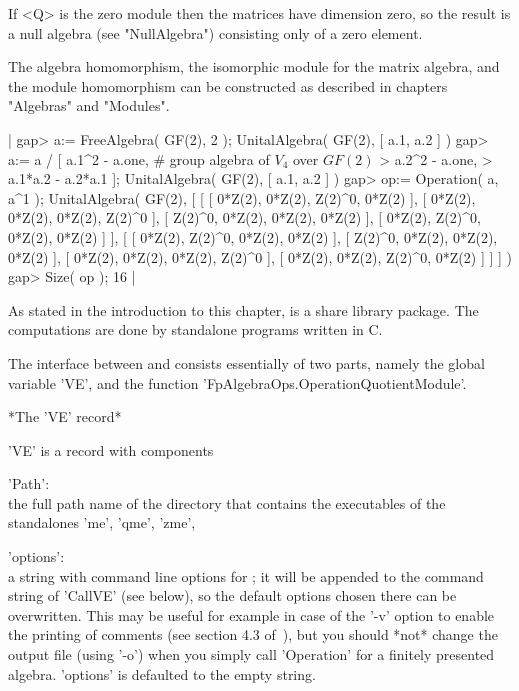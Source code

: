 If <Q> is the zero module then the matrices have dimension zero, so the
result is a null algebra (see "NullAlgebra") consisting only of a zero
element.

The algebra homomorphism, the isomorphic module for the matrix algebra,
and the module homomorphism can be constructed as described in chapters
"Algebras" and "Modules".

|    gap> a:= FreeAlgebra( GF(2), 2 );
    UnitalAlgebra( GF(2), [ a.1, a.2 ] )
    gap> a:= a / [ a.1^2 - a.one, # group algebra of $V_4$ over $GF(2)$
    >              a.2^2 - a.one,
    >              a.1*a.2 - a.2*a.1 ];
    UnitalAlgebra( GF(2), [ a.1, a.2 ] )
    gap> op:= Operation( a, a^1 );
    UnitalAlgebra( GF(2),
    [ [ [ 0*Z(2), 0*Z(2), Z(2)^0, 0*Z(2) ], [ 0*Z(2), 0*Z(2), 0*Z(2),
              Z(2)^0 ], [ Z(2)^0, 0*Z(2), 0*Z(2), 0*Z(2) ],
          [ 0*Z(2), Z(2)^0, 0*Z(2), 0*Z(2) ] ],
      [ [ 0*Z(2), Z(2)^0, 0*Z(2), 0*Z(2) ],
          [ Z(2)^0, 0*Z(2), 0*Z(2), 0*Z(2) ],
          [ 0*Z(2), 0*Z(2), 0*Z(2), Z(2)^0 ],
          [ 0*Z(2), 0*Z(2), Z(2)^0, 0*Z(2) ] ] ] )
    gap> Size( op );
    16 |


As stated in the introduction to this chapter, {\VE} is a share library
package.  The computations are done by standalone programs written in C.

The interface between {\VE} and {\GAP} consists essentially of two parts,
namely the global variable 'VE', and the function
'FpAlgebraOps.OperationQuotientModule'.

\vspace{5mm}

*The 'VE' record*

'VE' is a record with components

'Path': \\ the full path name of the directory that contains the
           executables of the standalones 'me', 'qme', 'zme',

'options': \\
  a string with command line options for {\VE};
  it will be appended to the command string of 'CallVE' (see below),
  so the default options chosen there can be overwritten.
  This may be useful for example in case of the '-v' option to enable the
  printing of comments (see section 4.3 of~\cite{Lin93}), but you should
  *not* change the output file (using '-o') when you simply call
  'Operation' for a finitely presented algebra.
  'options' is defaulted to the empty string.

